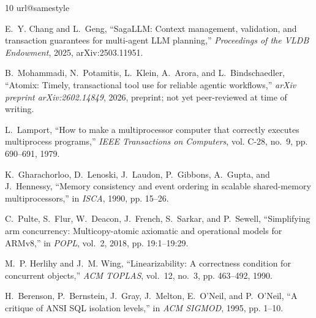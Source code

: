 \documentclass[journal,compsoc,10pt]{IEEEtran}
\theoremstyle{definition}
\theoremstyle{remark}
\begin{document}
\begin{thebibliography}{10}
\providecommand{\url}[1]{#1}
\csname url@samestyle\endcsname
\providecommand{\newblock}{\relax}
\providecommand{\bibinfo}[2]{#2}
\providecommand{\BIBentrySTDinterwordspacing}{\spaceskip=0pt\relax}
\providecommand{\BIBentryALTinterwordstretchfactor}{4}
\providecommand{\BIBentryALTinterwordspacing}{\spaceskip=\fontdimen2\font plus
\BIBentryALTinterwordstretchfactor\fontdimen3\font minus
  \fontdimen4\font\relax}
\providecommand{\BIBforeignlanguage}[2]{{%
\expandafter\ifx\csname l@#1\endcsname\relax
\typeout{** WARNING: IEEEtran.bst: No hyphenation pattern has been}%
\typeout{** loaded for the language `#1'. Using the pattern for}%
\typeout{** the default language instead.}%
\else
\language=\csname l@#1\endcsname
\fi
#2}}
\providecommand{\BIBdecl}{\relax}
\BIBdecl

E.~Y. Chang and L.~Geng, ``{SagaLLM}: Context management, validation, and
  transaction guarantees for multi-agent {LLM} planning,'' \emph{Proceedings of
  the VLDB Endowment}, 2025, arXiv:2503.11951.

B.~Mohammadi, N.~Potamitis, L.~Klein, A.~Arora, and L.~Bindschaedler, ``Atomix:
  Timely, transactional tool use for reliable agentic workflows,'' \emph{arXiv
  preprint arXiv:2602.14849}, 2026, preprint; not yet peer-reviewed at time of
  writing.

L.~Lamport, ``How to make a multiprocessor computer that correctly executes
  multiprocess programs,'' \emph{IEEE Transactions on Computers}, vol. C-28,
  no.~9, pp. 690--691, 1979.

K.~Gharachorloo, D.~Lenoski, J.~Laudon, P.~Gibbons, A.~Gupta, and J.~Hennessy,
  ``Memory consistency and event ordering in scalable shared-memory
  multiprocessors,'' in \emph{ISCA}, 1990, pp. 15--26.

C.~Pulte, S.~Flur, W.~Deacon, J.~French, S.~Sarkar, and P.~Sewell,
  ``Simplifying arm concurrency: Multicopy-atomic axiomatic and operational
  models for {ARMv8},'' in \emph{POPL}, vol.~2, 2018, pp. 19:1--19:29.

M.~P. Herlihy and J.~M. Wing, ``Linearizability: A correctness condition for
  concurrent objects,'' \emph{ACM TOPLAS}, vol.~12, no.~3, pp. 463--492, 1990.

H.~Berenson, P.~Bernstein, J.~Gray, J.~Melton, E.~O'Neil, and P.~O'Neil, ``A
  critique of {ANSI} {SQL} isolation levels,'' in \emph{ACM SIGMOD}, 1995, pp.
  1--10.


\end{thebibliography}
\end{document}
